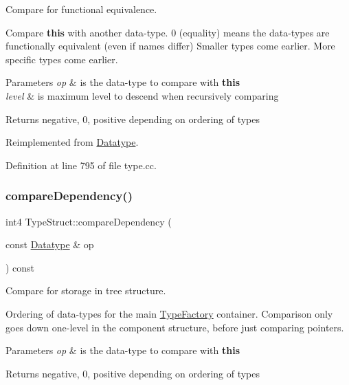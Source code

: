 Compare for functional equivalence. 

Compare {\bfseries{this}} with another data-\/type. 0 (equality) means the data-\/types are functionally equivalent (even if names differ) Smaller types come earlier. More specific types come earlier. 
\begin{DoxyParams}{Parameters}
{\em op} & is the data-\/type to compare with {\bfseries{this}} \\
\hline
{\em level} & is maximum level to descend when recursively comparing \\
\hline
\end{DoxyParams}
\begin{DoxyReturn}{Returns}
negative, 0, positive depending on ordering of types 
\end{DoxyReturn}


Reimplemented from \mbox{\hyperlink{class_datatype_a4d5a102b2d909180c3080fdb55d7b305}{Datatype}}.



Definition at line 795 of file type.\+cc.

\mbox{\label{class_type_struct_a12078b87b7fbc0f2ed5cb01ee5c61050}} 
\subsubsection{\texorpdfstring{compareDependency()}{compareDependency()}}
{\footnotesize\ttfamily int4 Type\+Struct\+::compare\+Dependency (\begin{DoxyParamCaption}\item[{const \mbox{\hyperlink{class_datatype}{Datatype}} \&}]{op }\end{DoxyParamCaption}) const\hspace{0.3cm}{\ttfamily [virtual]}}



Compare for storage in tree structure. 

Ordering of data-\/types for the main \mbox{\hyperlink{class_type_factory}{Type\+Factory}} container. Comparison only goes down one-\/level in the component structure, before just comparing pointers. 
\begin{DoxyParams}{Parameters}
{\em op} & is the data-\/type to compare with {\bfseries{this}} \\
\hline
\end{DoxyParams}
\begin{DoxyReturn}{Returns}
negative, 0, positive depending on ordering of types 
\end{DoxyReturn}



